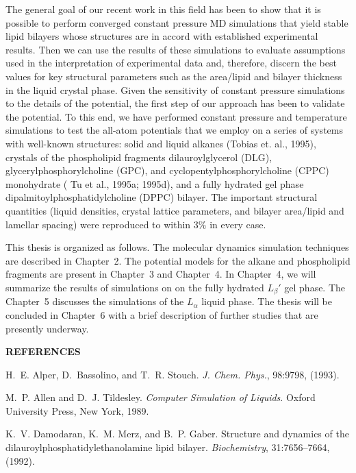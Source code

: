 The general goal of our recent work in this field has been to show that
it is possible to perform converged constant pressure MD simulations
that yield stable lipid bilayers whose structures are in accord with
established experimental results.
Then we can use the results of these simulations to evaluate
assumptions used in the interpretation of
experimental data and, therefore, discern the best values
for key structural parameters such as the area/lipid and bilayer
thickness in the liquid crystal phase. Given the sensitivity
of constant pressure simulations to the details of the potential,
the first step of our approach has been to validate the potential.
To this end, we have performed constant pressure and temperature
simulations to test the all-atom potentials that we employ on
a series of systems with well-known structures: solid and liquid alkanes
(Tobias et. al., 1995), crystals of the phospholipid fragments 
dilauroylglycerol (DLG),
glycerylphosphorylcholine (GPC), and cyclopentylphosphorylcholine (CPPC)
monohydrate ( Tu et al., 1995a; 1995d), and a fully hydrated
gel phase dipalmitoylphosphatidylcholine (DPPC) bilayer.
The important structural quantities (liquid densities, crystal
lattice parameters, and bilayer area/lipid and lamellar spacing)
were reproduced to within 3$\%$ in every case.

This thesis is organized as follows.
The molecular dynamics simulation techniques are described in
Chapter~2. The potential models for the alkane and phospholipid 
fragments are present in Chapter~3 and Chapter~4.
In Chapter~4, we will summarize the  results of simulations on on
the fully hydrated $L_\beta'$ gel phase. The Chapter~5 discusses the
simulations of the  $L_\alpha$ liquid phase. The thesis will be
concluded in Chapter~6 with a brief description of further studies
that are presently underway.

\clearpage
\parindent=0.0in
\vspace*{0.5truecm}

{\bf{REFERENCES}}

\vspace*{0.5truecm}

H.~E. Alper, D.~Bassolino, and T.~R. Stouch.
{\em J. Chem. Phys.}, 98:9798, (1993).

M.~P. Allen and D.~J. Tildesley.
{\em Computer Simulation of Liquids}.
Oxford University Press, New York, 1989.

K.~V. Damodaran, K.~M. Merz, and B.~P. Gaber.
Structure and dynamics of the dilauroylphosphatidylethanolamine lipid
  bilayer.
{\em Biochemistry}, 31:7656--7664, (1992).

